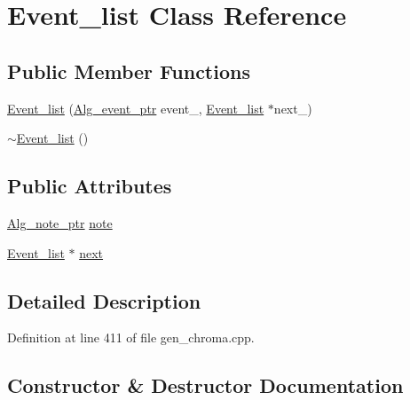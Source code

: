 \hypertarget{class_event__list}{}\section{Event\+\_\+list Class Reference}
\label{class_event__list}
\subsection*{Public Member Functions}
\begin{DoxyCompactItemize}
\item 
\hyperlink{class_event__list_a2ba65aba38bc4884bf2322a59c2b4771}{Event\+\_\+list} (\hyperlink{allegro_8h_aeb8db009b4ffadef2e7ca0e4936f0307}{Alg\+\_\+event\+\_\+ptr} event\+\_\+, \hyperlink{class_event__list}{Event\+\_\+list} $\ast$next\+\_\+)
\item 
\hyperlink{class_event__list_a7a70bc8e8857563243aeace737adfeb0}{$\sim$\+Event\+\_\+list} ()
\end{DoxyCompactItemize}
\subsection*{Public Attributes}
\begin{DoxyCompactItemize}
\item 
\hyperlink{allegro_8h_a49bc03b187e4468a764d73df4c860206}{Alg\+\_\+note\+\_\+ptr} \hyperlink{class_event__list_a9a08b25f82f30b67a9c72549365075a9}{note}
\item 
\hyperlink{class_event__list}{Event\+\_\+list} $\ast$ \hyperlink{class_event__list_aef3eab88092e0ddaa831b909a67df200}{next}
\end{DoxyCompactItemize}


\subsection{Detailed Description}


Definition at line 411 of file gen\+\_\+chroma.\+cpp.



\subsection{Constructor \& Destructor Documentation}
